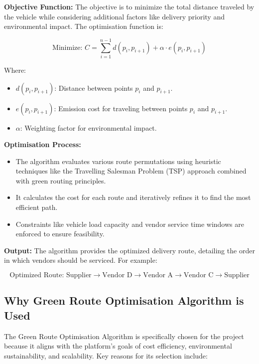 \textbf{Objective Function:}
The objective is to minimize the total distance traveled by the vehicle while considering additional factors like delivery priority and environmental impact. The optimisation function is:

\[
    \text{Minimize: } C = \sum_{i=1}^{n-1} d(p_i, p_{i+1}) + \alpha \cdot e(p_i, p_{i+1})
\]

Where:
\begin{itemize}
    \item \(d(p_i, p_{i+1})\): Distance between points \(p_i\) and \(p_{i+1}\).
    \item \(e(p_i, p_{i+1})\): Emission cost for traveling between points \(p_i\) and \(p_{i+1}\).
    \item \(\alpha\): Weighting factor for environmental impact.
\end{itemize}

\textbf{Optimisation Process:}
\begin{itemize}
    \item The algorithm evaluates various route permutations using heuristic techniques like the Travelling Salesman Problem (TSP) approach combined with green routing principles.
    \item It calculates the cost for each route and iteratively refines it to find the most efficient path.
    \item Constraints like vehicle load capacity and vendor service time windows are enforced to ensure feasibility.
\end{itemize}

\textbf{Output:}
The algorithm provides the optimized delivery route, detailing the order in which vendors should be serviced. For example:

\[
    \text{Optimized Route: Supplier} \rightarrow \text{Vendor D} \rightarrow \text{Vendor A} \rightarrow \text{Vendor C} \rightarrow \text{Supplier}
\]

\subsection{Why Green Route Optimisation Algorithm is Used}

The Green Route Optimisation Algorithm is specifically chosen for the project because it aligns with the platform's goals of cost efficiency, environmental sustainability, and scalability. Key reasons for its selection include:

